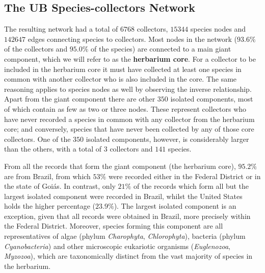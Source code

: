 \subsection{The UB Species-collectors Network}

The resulting network had a total of $6768$ collectors, $15344$ species nodes and $142647$ edges connecting species to collectors. Most nodes in the network ($93.6\%$ of the collectors and $95.0\%$ of the species) are connected to a main giant component, which we will refer to as the \textbf{herbarium core}. For a collector to be included in the herbarium core it must have collected at least one species in common with another collector who is also included in the core. The same reasoning applies to species nodes as well by observing the inverse relationship.
Apart from the giant component there are other $350$ isolated components, most of which contain as few as two or three nodes. These represent collectors who have never recorded a species in common with any collector from the herbarium core; and conversely, species that have never been collected by any of those core collectors.
One of the $350$ isolated components, however, is considerably larger than the others, with a total of $3$ collectors and $141$ species. 

From all the records that form the giant component (the herbarium core), $95.2\%$ are from Brazil, from which $53\%$ were recorded either in the Federal District or in the state of Goiás. In contrast, only $21\%$ of the records which form all but the largest isolated component were recorded in Brazil, whilst the United States holds the higher percentage ($23.9\%$). The largest isolated component is an exception, given that all records were obtained in Brazil, more precisely within the Federal District. Moreover, species forming this component are all representatives of algae (phylum \textit{Charophyta}, \textit{Chlorophyta}), bacteria (phylum \textit{Cyanobacteria}) and other microscopic eukariotic organisms (\textit{Euglenozoa}, \textit{Myzozoa}), which are taxonomically distinct from the vast majority of species in the herbarium.

